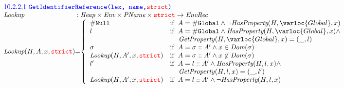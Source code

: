 \[\begin{array}{l@{}c@{}l}
\multicolumn{3}{l}{\mbox{\inblue 10.2.2.1 {\tt GetIdentifierReference(lex, name,{\inred strict})}}}\\
\hf{Lookup} & :& \Heap \times \Env \times \pname \times \strict \rightarrow \emph{EnvRec} \\
\hf{Lookup}(H,A,x,\strict) &=&
\left\{\begin{array}{ll}
\nullL & \ifc{A = \lg \wedge \neg\hf{HasProperty}(H,\varloc{Global},x)}\\
l & \ifc{A = \lg \wedge \hf{HasProperty}(H,\varloc{Global},x) \wedge} \\
& \mbox{\phantom{if }  \hf{GetProperty}$(H,\varloc{Global},x)=(\_, l)$} \\
\er &\ifc{A = \er::A'\wedge x\in\hf{Dom}(\er)} \\
\hf{Lookup}(H, A',x,\strict) &\ifc{A = \er::A'\wedge x\not\in\hf{Dom}(\er)}\\
l'  &\ifc{A = l::A' \wedge \hf{HasProperty}(H,l,x) \wedge} \\
& \mbox{\phantom{if }  \hf{GetProperty}$(H,l,x)=(\_, l')$} \\
\hf{Lookup}(H, A',x,\strict) &\ifc{A = l::A' \wedge \neg\hf{HasProperty}(H,l,x)} \\
\end{array}\right.
\\[2em]
\end{array}
\]



